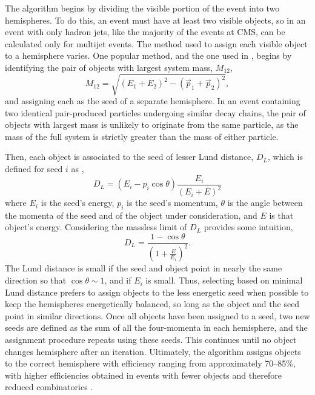     The algorithm begins by dividing the visible portion of the event into two hemispheres.
    To do this, an event must have at least two visible objects, so in an event with only hadron jets, like the majority of the events at CMS, \mttwo can be calculated only for multijet events.
    The method used to assign each visible object to a hemisphere varies.
    One popular method, and the one used in \cite{MT2_2019}, begins by identifying the pair of objects with largest system mass, $M_{12}$,
    \begin{equation} \label{eqn:dijetmass}
      M_{12} = \sqrt{(E_1+E_2)^2-(\vec{p}_1+\vec{p}_2)^2},
    \end{equation}
    and assigning each as the seed of a separate hemisphere.
    In an event containing two identical pair-produced particles undergoing similar decay chains, the pair of objects with largest mass is unlikely to originate from the same particle, as the mass of the full system is strictly greater than the mass of either particle.

    Then, each object is associated to the seed of lesser Lund distance, $D_{L}$, which is defined for seed $i$ as \cite{lund1,lund2},
    \begin{equation} \label{eqn:lund}
      D_L = (E_{i}-p_{i}\cos\theta)\frac{E_{i}}{(E_{i}+E)^2}
    \end{equation}
    where $E_i$ is the seed's energy, $p_i$ is the seed's momentum, $\theta$ is the angle between the momenta of the seed and of the object under consideration, and $E$ is that object's energy.
    Considering the massless limit of $D_L$ provides some intuition,
    \begin{equation} \label{eqn:lund}
      D_L = \frac{1-\cos\theta}{(1+\frac{E}{E_i})^2}.
    \end{equation}
    The Lund distance is small if the seed and object point in nearly the same direction so that $\cos\theta\sim1$, and if $E_i$ is small.
    Thus, selecting based on minimal Lund distance prefers to assign objects to the less energetic seed when possible to keep the hemispheres energetically balanced, so long as the object and the seed point in similar directions.
    Once all objects have been assigned to a seed, two new seeds are defined as the sum of all the four-momenta in each hemisphere, and the assignment procedure repeats using these seeds.
    This continues until no object changes hemisphere after an iteration.
    Ultimately, the algorithm assigns objects to the correct hemisphere with efficiency ranging from approximately 70--85\%, with higher efficiencies obtained in events with fewer objects and therefore reduced combinatorics \cite{lundeff}.

